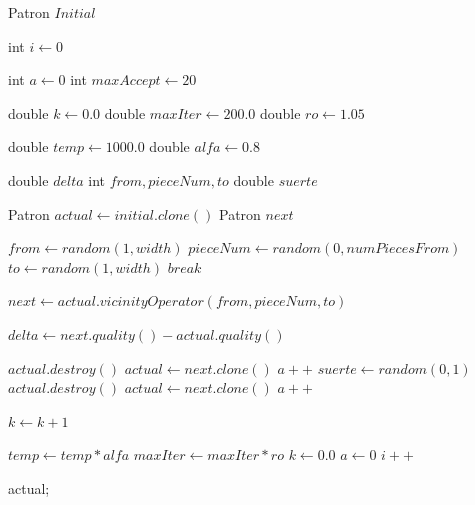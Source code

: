 \documentclass[letterpaper,11pt]{article}
\begin{document}
\begin{center}
\begin{algorithmic}

\REQUIRE Patron $Initial$

\STATE int $i \gets 0$

\STATE int $a \gets 0$
\STATE int $maxAccept \gets 20$  

\STATE double $k \gets 0.0$
\STATE double $maxIter \gets 200.0$
\STATE double $ro \gets 1.05$

\STATE double $temp \gets 1000.0$
\STATE double $alfa \gets 0.8$

\STATE double $delta$
\STATE int $from, pieceNum, to$
\STATE double $suerte$
  
\STATE Patron $actual \gets initial.clone()$
\STATE Patron $next$



        	\STATE $from \gets random(1,width)$
          		\STATE $pieceNum \gets random(0,numPiecesFrom)$
          		\STATE $to \gets random(1,width)$
          		\STATE $break$
        	\ENDIF
      	\ENDWHILE

      	\STATE $next \gets actual.vicinityOperator(from,pieceNum,to)$

      	\STATE $delta \gets next.quality() - actual.quality()$

        	\STATE $actual.destroy()$
        	\STATE $actual \gets next.clone()$
        	\STATE $a++$	
      	\ELSE
        	\STATE $suerte \gets random(0,1)$
            		\STATE $actual.destroy()$
            		\STATE $actual \gets next.clone()$
            		\STATE $a++$
          		\ENDIF
        	\ENDIF
      	\ENDIF

      	\STATE $k \gets k + 1$
    \ENDWHILE
    
    \STATE $temp \gets temp * alfa$
    \STATE $maxIter \gets maxIter * ro$
    \STATE $k \gets 0.0$
    \STATE $a \gets 0$
    \STATE $i++$
\ENDWHILE
  
\RETURN actual;

\end{algorithmic}
\end{center}
\end{document}
